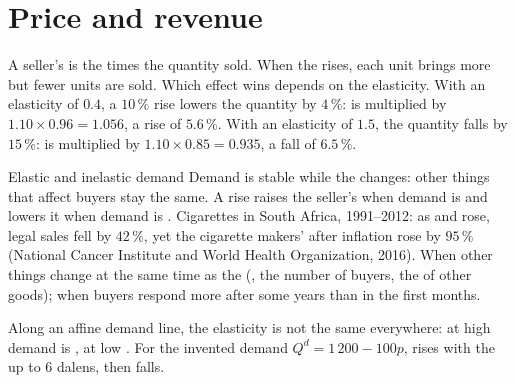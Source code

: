 \section{Price and revenue}

A seller's  is the  times the quantity sold. When the  rises, each unit brings more
but fewer units are sold. Which effect wins depends on the elasticity. With an elasticity of $0.4$, a
$10\,\%$  rise lowers the quantity by $4\,\%$:  is multiplied by $1.10 \times 0.96 = 1.056$,
a rise of $5.6\,\%$. With an elasticity of $1.5$, the quantity falls by $15\,\%$:  is multiplied by
$1.10 \times 0.85 = 0.935$, a fall of $6.5\,\%$.

\begin{model}{Elastic and inelastic demand}
\assumes Demand is stable while the  changes: other things that affect buyers stay the same.
\predicts A  rise raises the seller's  when demand is  and lowers it when demand
is .
\tested Cigarettes in South Africa, 1991--2012: as  and  rose, legal sales fell by
$42\,\%$, yet the cigarette makers'  after inflation rose by $95\,\%$ (National Cancer Institute
and World Health Organization, 2016).
\breaks When other things change at the same time as the  (, the number of buyers, the
 of other goods); when buyers respond more after some years than in the first months.
\end{model}

Along an affine demand line, the elasticity is not the same everywhere: at high  demand is ,
at low  . For the invented demand $Q^d = 1\,200 - 100p$,  rises with the  up
to 6 dalens, then falls.

